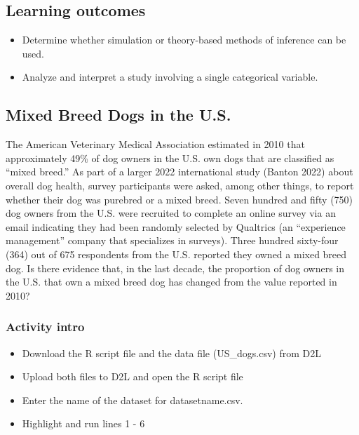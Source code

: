 \documentclass[
]{report}
\begin{document}

\subsection{Learning outcomes}\label{learning-outcomes-10}

\begin{itemize}
\item
  Determine whether simulation or theory-based methods of inference can be used.
\item
  Analyze and interpret a study involving a single categorical variable.
\end{itemize}

\subsection{Mixed Breed Dogs in the U.S.}\label{mixed-breed-dogs-in-the-u.s.}

The American Veterinary Medical Association estimated in 2010 that approximately 49\% of dog owners in the U.S. own dogs that are classified as ``mixed breed.'' As part of a larger 2022 international study (Banton 2022) about overall dog health, survey participants were asked, among other things, to report whether their dog was purebred or a mixed breed. Seven hundred and fifty (750) dog owners from the U.S. were recruited to complete an online survey via an email indicating they had been randomly selected by Qualtrics (an ``experience management'' company that specializes in surveys). Three hundred sixty-four (364) out of 675 respondents from the U.S. reported they owned a mixed breed dog. Is there evidence that, in the last decade, the proportion of dog owners in the U.S. that own a mixed breed dog has changed from the value reported in 2010?

\subsubsection*{Activity intro}\label{activity-intro-1}

\begin{itemize}
\item
  Download the R script file and the data file (US\_dogs.csv) from D2L
\item
  Upload both files to D2L and open the R script file
\item
  Enter the name of the dataset for datasetname.csv.
\item
  Highlight and run lines 1 - 6
\end{itemize}
\end{document}
